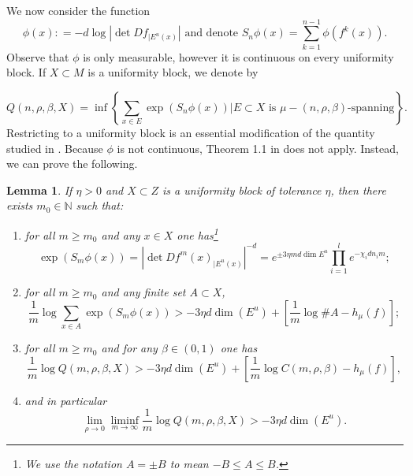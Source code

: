 \documentclass{amsart}
\theoremstyle{plain}
\newtheorem{lem}[thm]{Lemma}
\theoremstyle{definition}
\theoremstyle{remark}
\numberwithin{equation}{section}
\begin{document}
We now consider the function $$  \phi(x): =    -d \log |  \det Df_{| E^u(x)} |  \text{ and denote } S_n\phi(x) = \sum_{k=1}^{n-1}\phi (f^k(x)).  $$ Observe that $\phi$ is only measurable, however it is continuous on every uniformity block.
If $X\subset M$ is a uniformity block, we denote by

$$     Q(n,\rho,\beta, X) = \inf \left\{    \sum_{x\in E}  \exp(S_n\phi(x))   |         E\subset X \text{ is }  \mu-(n,\rho,\beta)  \text{-spanning}          \right\}  .   $$ 
Restricting to a uniformity block is an essential modification of the quantity studied in \cite{Mendoza}. Because $\phi$ is not continuous, Theorem 1.1 in  \cite{Mendoza} does not apply.
Instead, we can prove the following.

\begin{lem}\label{lem:partsum}
If $\eta >0$ and $X\subset Z$ is a uniformity block of tolerance $\eta$, then there exists $m_0\in\mathbb{N}$ such that:
\begin{enumerate}
\item for all $m\geq m_0$ and any $x\in X$ one has\footnote{ We use the notation $A = \pm B$ to mean $  -B \leq  A  \leq B  $.} 
$$    \exp( S_m\phi (x)) =   | \det Df^m(x)_{| E^u(x)}  | ^{-d} =     e^{  \pm 3 \eta m d   \dim E^u}     \prod_{i=1}^{l}   e^{-\chi_i    d n_i   m };$$
\item for all $m\geq m_0$ and any finite set $A\subset X$,
$$  \frac{1}{m} \log  \sum_{x\in A}   \exp(S_m \phi (x)) > -3\eta d \dim(E^u) + \left[  \frac{1}{m} \log   \# A   - h_{\mu}(f)  \right] ; $$
\item for all $m\geq m_0$ and for any $\beta\in (0,1)$ one has
$$  \frac{1}{m} \log   Q(m,\rho,\beta, X) > -3\eta d \dim(E^u) + \left[  \frac{1}{m} \log   C(m,\rho,\beta)   - h_{\mu}(f)  \right] , $$
\item and in particular
$$  \lim_{\rho\to 0}   \liminf_{m\to \infty} \frac{1}{m} \log   Q(m,\rho,\beta, X) > -3\eta d \dim(E^u).$$
\end{enumerate}
\end{lem}
\end{document}
